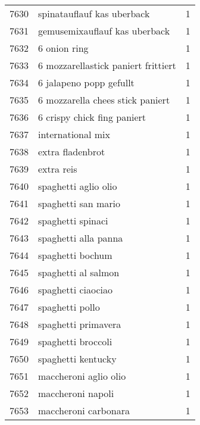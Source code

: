 \begin{tabular}{llr}
7630 &                         spinatauflauf kas uberback &      1 \\
7631 &                      gemusemixauflauf kas uberback &      1 \\
7632 &                                       6 onion ring &      1 \\
7633 &                6 mozzarellastick paniert frittiert &      1 \\
7634 &                            6 jalapeno popp gefullt &      1 \\
7635 &                   6 mozzarella chees stick paniert &      1 \\
7636 &                        6 crispy chick fing paniert &      1 \\
7637 &                                  international mix &      1 \\
7638 &                                   extra fladenbrot &      1 \\
7639 &                                         extra reis &      1 \\
7640 &                               spaghetti aglio olio &      1 \\
7641 &                                spaghetti san mario &      1 \\
7642 &                                  spaghetti spinaci &      1 \\
7643 &                               spaghetti alla panna &      1 \\
7644 &                                   spaghetti bochum &      1 \\
7645 &                                spaghetti al salmon &      1 \\
7646 &                                 spaghetti ciaociao &      1 \\
7647 &                                    spaghetti pollo &      1 \\
7648 &                                spaghetti primavera &      1 \\
7649 &                                 spaghetti broccoli &      1 \\
7650 &                                 spaghetti kentucky &      1 \\
7651 &                              maccheroni aglio olio &      1 \\
7652 &                                  maccheroni napoli &      1 \\
7653 &                               maccheroni carbonara &      1 \\

\end{tabular}
